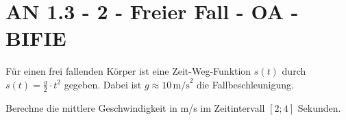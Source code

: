 \section{AN 1.3 - 2 - Freier Fall - OA - BIFIE}


\begin{beispiel}[AN 1.3]{1} %
Für einen frei fallenden Körper ist eine Zeit-Weg-Funktion $s(t)$ durch $s(t) = \frac{g}{2} \cdot t^2$ gegeben. Dabei ist $g \approx 10\,\text{m/s}^2$ die Fallbeschleunigung. 

Berechne die mittlere Geschwindigkeit in m/s im Zeitintervall $[2;4]$ Sekunden.

\end{beispiel}